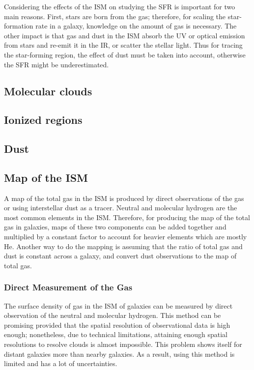 Considering the effects of the ISM on studying the SFR is important for two main reasons. First, stars are born from the gas; therefore, for scaling the star-formation rate in a galaxy, knowledge on the amount of gas is necessary. The other impact is that gas and dust in the ISM absorb the UV or optical emission from stars and re-emit it in the IR, or scatter the stellar light. Thus for tracing the star-forming region, the effect of dust must be taken into account, otherwise the SFR might be underestimated. 
\subsection{Molecular clouds}
\subsection{Ionized regions}
\subsection{Dust}

\subsection{Map of the ISM}
\label{sec: ismmap}

A map of the total gas in the ISM is produced by direct observations of the gas or using interstellar dust as a tracer. Neutral and molecular hydrogen are the most common elements in the ISM. Therefore, for producing the map of the total gas in galaxies, maps of these two components can be added together and multiplied by a constant factor to account for heavier elements which are mostly He. Another way to do the mapping is assuming that the ratio of total gas and dust is constant across a galaxy, and convert dust observations to the map of total gas.

\subsubsection{Direct Measurement of the Gas}

The surface density of gas in the ISM of galaxies can be measured by direct observation of the neutral and molecular hydrogen. This method can be promising provided that the spatial resolution of observational data is high enough; nonetheless, due to technical limitations, attaining enough spatial resolutions to resolve clouds is almost impossible. This problem shows itself for distant galaxies more than nearby galaxies. As a result, using this method is limited and has a lot of uncertainties. 
 
